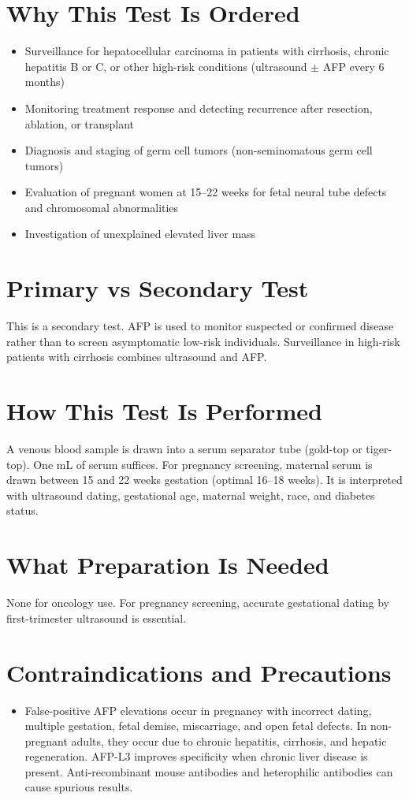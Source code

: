 \section*{Why This Test Is Ordered}
\begin{itemize}
  \item Surveillance for hepatocellular carcinoma in patients with cirrhosis, chronic hepatitis B or C, or other high-risk conditions (ultrasound $\pm$ AFP every 6 months) \cite{marrero2018diagnosis}
  \item Monitoring treatment response and detecting recurrence after resection, ablation, or transplant
  \item Diagnosis and staging of germ cell tumors (non-seminomatous germ cell tumors)
  \item Evaluation of pregnant women at 15--22 weeks for fetal neural tube defects and chromosomal abnormalities
  \item Investigation of unexplained elevated liver mass
\end{itemize}

\section*{Primary vs Secondary Test}
This is a secondary test. AFP is used to monitor suspected or confirmed disease rather than to screen asymptomatic low-risk individuals. Surveillance in high-risk patients with cirrhosis combines ultrasound and AFP.

\section*{How This Test Is Performed}
A venous blood sample is drawn into a serum separator tube (gold-top or tiger-top). One mL of serum suffices. For pregnancy screening, maternal serum is drawn between 15 and 22 weeks gestation (optimal 16--18 weeks). It is interpreted with ultrasound dating, gestational age, maternal weight, race, and diabetes status.

\section*{What Preparation Is Needed}
None for oncology use. For pregnancy screening, accurate gestational dating by first-trimester ultrasound is essential.

\section*{Contraindications and Precautions}
\begin{itemize}
  \item False-positive AFP elevations occur in pregnancy with incorrect dating, multiple gestation, fetal demise, miscarriage, and open fetal defects. In non-pregnant adults, they occur due to chronic hepatitis, cirrhosis, and hepatic regeneration. AFP-L3 improves specificity when chronic liver disease is present. Anti-recombinant mouse antibodies and heterophilic antibodies can cause spurious results.
\end{itemize}
